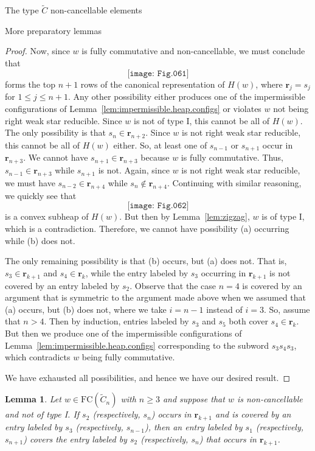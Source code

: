 \documentclass[12pt]{amsart}
\newtheorem{lem}[thm]{Lemma}
\newcommand{\C}{\widetilde{C}}
\renewcommand{\(}{\left(}
\renewcommand{\)}{\right)}
\newcommand{\FC}{\mathrm{FC}}
\renewcommand{\r}{\mathbf{r}}
\begin{document}
\begin{section}{The type $\C$ non-cancellable elements}
\begin{subsection}{More preparatory lemmas}
\begin{proof}
Now, since $w$ is fully commutative and non-cancellable, we must conclude that 
\[
\texttt{[image: Fig.061]}
\]
forms the top $n+1$ rows of the canonical representation of $H(w)$, where $\r_j=s_j$ for $1\leq j\leq n+1$.  Any other possibility either produces one of the impermissible configurations of Lemma~\ref{lem:impermissible.heap.configs} or violates $w$ not being right weak star reducible.  Since $w$ is not of type I, this cannot be all of $H(w)$.  The only possibility is that $s_n\in\r_{n+2}$.   Since $w$ is not right weak star reducible, this cannot be all of $H(w)$ either.  So, at least one of $s_{n-1}$ or $s_{n+1}$ occur in $\r_{n+3}$.  We cannot have $s_{n+1} \in \r_{n+3}$ because $w$ is fully commutative.  Thus, $s_{n-1} \in \r_{n+3}$ while $s_{n+1}$ is not.  Again, since $w$ is not right weak star reducible, we must have $s_{n-2} \in \r_{n+4}$ while $s_{n} \notin \r_{n+4}$.  Continuing with similar reasoning, we quickly see that
\[
\texttt{[image: Fig.062]}
\]
is a convex subheap of $H(w)$.  But then by Lemma~\ref{lem:zigzag}, $w$ is of type I, which is a contradiction.  Therefore, we cannot have possibility (a) occurring while (b) does not.

The only remaining possibility is that (b) occurs, but (a) does not.  That is, $s_{3} \in \r_{k+1}$ and $s_{4} \in \r_{k}$, while the entry labeled by $s_{3}$ occurring in $\r_{k+1}$ is not covered by an entry labeled by $s_{2}$.  Observe that the case $n=4$ is covered by an argument that is symmetric to the argument made above when we assumed that (a) occurs, but (b) does not, where we take $i=n-1$ instead of $i=3$.  So, assume that $n>4$.  Then by induction, entries labeled by $s_{3}$ and $s_{5}$ both cover $s_4\in\r_{k}$.  But then we produce one of the impermissible configurations of Lemma~\ref{lem:impermissible.heap.configs} corresponding to the subword $s_{3}s_{4}s_{3}$, which contradicts $w$ being fully commutative.  

We have exhausted all possibilities, and hence we have our desired result.
\end{proof}

\begin{lem}\label{lem:weak.star.end}
Let $w \in \FC(\C_{n})$ with $n\geq 3$ and suppose that $w$ is non-cancellable and not of type I.   If $s_{2}$ (respectively, $s_n$) occurs in $\r_{k+1}$ and is covered by an entry labeled by $s_{3}$ (respectively, $s_{n-1}$), then an entry labeled by $s_{1}$ (respectively, $s_{n+1}$) covers the entry labeled by $s_{2}$ (respectively, $s_n$) that occurs in $\r_{k+1}$.
\end{lem}


\end{subsection}
\end{section}
\end{document}
